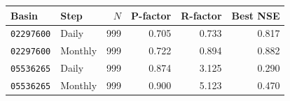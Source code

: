 \begin{tabular}{@{}llrrrr@{}}
\toprule
Basin & Step & $N$ & P-factor & R-factor & Best NSE \\
\midrule
\texttt{02297600} & Daily & 999 & 0.705 & 0.733 & 0.817 \\
\texttt{02297600} & Monthly & 999 & 0.722 & 0.894 & 0.882 \\
\texttt{05536265} & Daily & 999 & 0.874 & 3.125 & 0.290 \\
\texttt{05536265} & Monthly & 999 & 0.900 & 5.123 & 0.470 \\
\bottomrule
\end{tabular}

